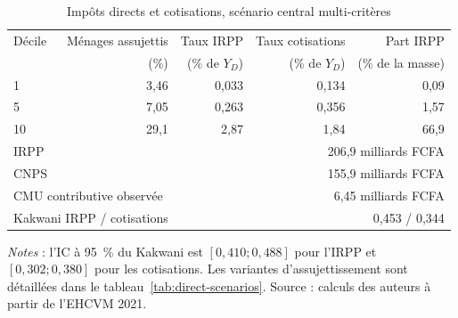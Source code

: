 \documentclass[11pt,a4paper]{article}
\begin{document}
\begin{table}[t]
\centering
\begin{threeparttable}
\caption{Impôts directs et cotisations, scénario central multi-critères}
\label{tab:direct}
\begin{tabular}{lrrrr}
\toprule
Décile & Ménages assujettis & Taux IRPP & Taux cotisations & Part IRPP \\
       & (\%) & (\% de $Y_D$) & (\% de $Y_D$) & (\% de la masse) \\
\midrule
1  & 3,46 & 0,033 & 0,134 & 0,09 \\
5  & 7,05 & 0,263 & 0,356 & 1,57 \\
10 & 29,1 & 2,87  & 1,84  & 66,9 \\
\midrule
\multicolumn{2}{l}{IRPP} & \multicolumn{3}{r}{206,9 milliards FCFA} \\
\multicolumn{2}{l}{CNPS} & \multicolumn{3}{r}{155,9 milliards FCFA} \\
\multicolumn{2}{l}{CMU contributive observée} & \multicolumn{3}{r}{6,45 milliards FCFA} \\
\multicolumn{2}{l}{Kakwani IRPP / cotisations} & \multicolumn{3}{r}{0,453 / 0,344} \\
\bottomrule
\end{tabular}
\begin{tablenotes}\footnotesize
\item \emph{Notes} : l'IC à 95~\% du Kakwani est $[0,410;0,488]$ pour l'IRPP
et $[0,302;0,380]$ pour les cotisations. Les variantes d'assujettissement sont
détaillées dans le tableau~\ref{tab:direct-scenarios}. Source : calculs des
auteurs à partir de l'EHCVM 2021.
\end{tablenotes}
\end{threeparttable}
\end{table}
\end{document}
